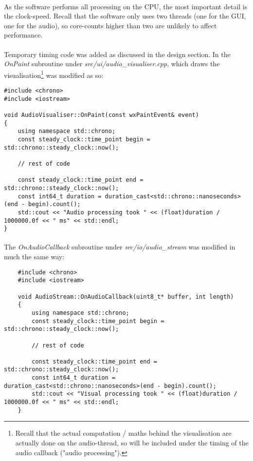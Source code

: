 \paragraph{}
As the software performs all processing on the CPU, the most important detail is the clock-speed. Recall that the software only uses two threads (one for the GUI, one for the audio), so core-counts higher than two are unlikely to affect performance.

\paragraph{}
Temporary timing code was added as discussed in the design section. In the \textit{OnPaint} subroutine under \textit{src/ui/audio\_visualiser.cpp}, which draws the visualisation\footnote{
	Recall that the actual computation / maths behind the visualisation are actually done on the audio-thread, so will be included under the timing of the audio callback ("audio processing").
} was modified as so:

\begin{verbatim}
#include <chrono>
#include <iostream>
	
void AudioVisualiser::OnPaint(const wxPaintEvent& event)
{
	using namespace std::chrono;
	const steady_clock::time_point begin = std::chrono::steady_clock::now();
	
	// rest of code
	
	const steady_clock::time_point end = std::chrono::steady_clock::now();
	const int64_t duration = duration_cast<std::chrono::nanoseconds>(end - begin).count();
	std::cout << "Audio processing took " << (float)duration / 1000000.0f << " ms" << std::endl;
}
\end{verbatim}

\pagebreak
\paragraph{}
The \textit{OnAudioCallback} subroutine under \textit{src/io/audio\_stream} was modified in much the same way:
\begin{verbatim}
	#include <chrono>
	#include <iostream>
	
	void AudioStream::OnAudioCallback(uint8_t* buffer, int length)
	{
		using namespace std::chrono;
		const steady_clock::time_point begin = std::chrono::steady_clock::now();
		
		// rest of code
		
		const steady_clock::time_point end = std::chrono::steady_clock::now();
		const int64_t duration = duration_cast<std::chrono::nanoseconds>(end - begin).count();
		std::cout << "Visual processing took " << (float)duration / 1000000.0f << " ms" << std::endl;
	}
\end{verbatim}


